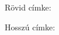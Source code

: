 \documentclass{article}
\begin{document}
\begin{description}
	\item [slanted]
	\item Rövid címke: \hulipsum[1]
	\item Hosszú címke: \hulipsum[1]
\end{description}
\end{document}
